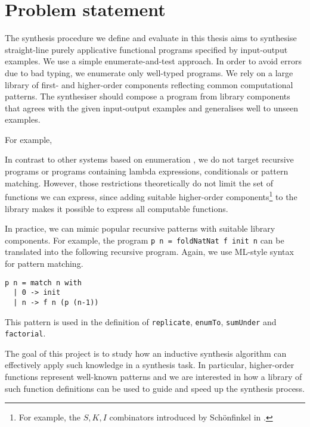 \section{Problem statement}\label{Problem}

The synthesis procedure we define and evaluate in this thesis aims to synthesise straight-line purely applicative functional programs specified by input-output examples. We use a simple enumerate-and-test approach. In order to avoid errors due to bad typing, we enumerate only well-typed programs. We rely on a large library of first- and higher-order components reflecting common computational patterns.
The synthesiser should compose a program from library components that agrees with the given input-output examples and generalises well to unseen examples.

For example, 

In contrast to other systems based on enumeration \cite{MythPaper, LambdaSquarePaper}, we do not target recursive programs or programs containing lambda expressions, conditionals or pattern matching. However, those restrictions theoretically do not limit the set of functions we can express, since adding suitable higher-order components\footnote{For example, the $S, K, I$ combinators introduced by Schönfinkel in \cite{Schönfinkel1924}.} to the library makes it possible to express all computable functions.

In practice, we can mimic popular recursive patterns with suitable library components. For example, the program \lstinline!p n = foldNatNat f init n! can be translated into the following recursive program. Again, we use ML-style syntax for pattern matching.
\begin{lstlisting}[style=plain]
p n = match n with
  | 0 -> init
  | n -> f n (p (n-1))
\end{lstlisting}
This pattern is used in the definition of \lstinline!replicate!, \lstinline!enumTo!, \lstinline!sumUnder! and \lstinline!factorial!.








The goal of this project is to study how an inductive synthesis algorithm can effectively apply such knowledge in a synthesis task. In particular, higher-order functions represent well-known patterns and we are interested in how a library of such function definitions can be used to guide and speed up the synthesis process.

